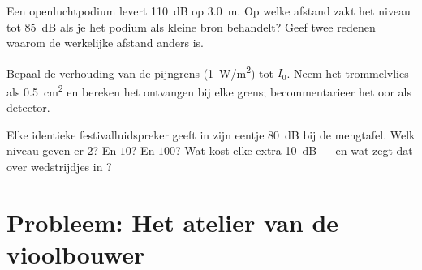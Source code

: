 \begin{exercise}[$\star\star\star$]\label{exo:g12:sound-acoustics:13}
Een openluchtpodium levert \qty{110}{dB} op \qty{3.0}{m}. Op welke
afstand zakt het niveau tot \qty{85}{dB} als je het podium als kleine bron
behandelt? Geef twee redenen waarom de werkelijke afstand anders is.
\end{exercise}

\begin{exercise}[$\star\star\star$]\label{exo:g12:sound-acoustics:14}
Bepaal de verhouding van de pijngrens (\qty{1}{W/m^2}) tot $I_0$. Neem
het trommelvlies als \qty{0.5}{cm^2} en bereken het ontvangen  bij
elke grens; becommentarieer het oor als detector.
\end{exercise}

\begin{exercise}[$\star\star\star$]\label{exo:g12:sound-acoustics:15}
Elke identieke festivalluidspreker geeft in zijn eentje \qty{80}{dB} bij
de mengtafel. Welk niveau geven er $2$? En $10$? En $100$? Wat kost elke
extra \qty{+10}{dB} --- en wat zegt dat over wedstrijdjes in ?
\end{exercise}

\section{Probleem: Het atelier van de vioolbouwer}

